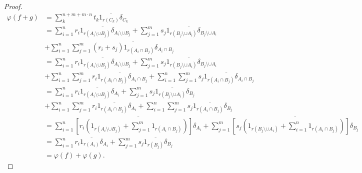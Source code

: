 \documentclass[11pt, a4paper]{amsart}
\theoremstyle{plain}
\begin{document}
\begin{proof}
\begin{align*}
\varphi(f+g) & = \sum_k^{n+m+m \cdot n} \overline {t_k 1_{r(C_k)}\delta_{C_k}} \\
             & = \sum_{i=1}^n \overline{r_i 1_{r(A_i \setminus \cup B_j)} \delta_{A_i \setminus \cup B_j}}
               + \sum_{j=1}^m \overline{s_j 1_{r(B_j\setminus \cup A_i)} \delta_{B_j \setminus \cup A_i}} \\
             & + \sum_{i=1}^n \sum_{j=1}^m \overline{(r_i + s_j) 1_{r(A_i \cap B_j)} \delta_{A_i \cap B_j}} \\
             & = \sum_{i=1}^n \overline{r_i 1_{r(A_i \setminus \cup B_j)} \delta_{A_i \setminus \cup B_j}}
               + \sum_{j=1}^m \overline{s_j 1_{r(B_j\setminus \cup A_i)} \delta_{B_j \setminus \cup A_i}} \\
             & + \sum_{i=1}^n \sum_{j=1}^m \overline{r_i  1_{r(A_i \cap B_j)} \delta_{A_i \cap B_j}}
               + \sum_{i=1}^n \sum_{j=1}^m \overline{s_j 1_{r(A_i \cap B_j)} \delta_{A_i \cap B_j}} \\
             & = \sum_{i=1}^n \overline{r_i 1_{r(A_i \setminus \cup B_j)} \delta_{A_i}}
               + \sum_{j=1}^m \overline{s_j 1_{r(B_j\setminus \cup A_i)} \delta_{B_j }} \\
             & + \sum_{i=1}^n \sum_{j=1}^m \overline{r_i  1_{r(A_i \cap B_j)} \delta_{A_i}}
               + \sum_{i=1}^n \sum_{j=1}^m \overline{s_j 1_{r(A_i \cap B_j)} \delta_{B_j}} \\  
             & = \sum_{i=1}^n \overline{[r_i( 1_{r(A_i\setminus \cup B_j)}+ \sum_{j=1}^m 1_{r(A_i \cap B_j)})]\delta_{A_i}}
               + \sum_{j=1}^m \overline{[s_j (1_{r(B_j\setminus \cup A_i)}+ \sum_{i=1}^n 1_{r(A_i \cap B_j)})] \delta_{B_j}}\\
             & = \sum_{i=1}^n \overline{r_i 1_{r(A_i)}\delta_{A_i}} 
               + \sum_{j=1}^m \overline{s_j 1_{r(B_j)} \delta_{B_j}}  \\
             & = \varphi(f) + \varphi (g). 
\end{align*}

\end{proof}
\end{document}
